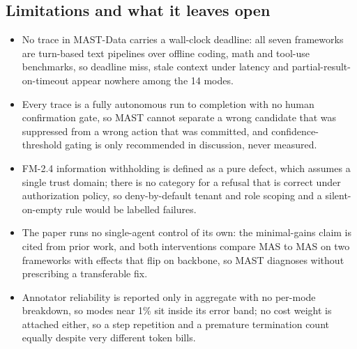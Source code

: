 \subsection{Limitations and what it leaves open}
\begin{itemize}[leftmargin=*,itemsep=1pt,topsep=2pt]
  \item No trace in MAST-Data carries a wall-clock deadline: all seven frameworks are turn-based text pipelines over offline coding, math and tool-use benchmarks, so deadline miss, stale context under latency and partial-result-on-timeout appear nowhere among the 14 modes.
  \item Every trace is a fully autonomous run to completion with no human confirmation gate, so MAST cannot separate a wrong candidate that was suppressed from a wrong action that was committed, and confidence-threshold gating is only recommended in discussion, never measured.
  \item FM-2.4 information withholding is defined as a pure defect, which assumes a single trust domain; there is no category for a refusal that is correct under authorization policy, so deny-by-default tenant and role scoping and a silent-on-empty rule would be labelled failures.
  \item The paper runs no single-agent control of its own: the minimal-gains claim is cited from prior work, and both interventions compare MAS to MAS on two frameworks with effects that flip on backbone, so MAST diagnoses without prescribing a transferable fix.
  \item Annotator reliability is reported only in aggregate with no per-mode breakdown, so modes near 1\% sit inside its error band; no cost weight is attached either, so a step repetition and a premature termination count equally despite very different token bills.
\end{itemize}
